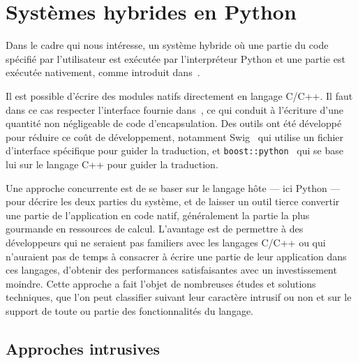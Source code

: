 \documentclass[renpar]{compas2013}
\begin{document}
\section{Systèmes hybrides en Python}\label{sec:python-hybrid}

Dans le cadre qui nous intéresse, un système hybride où une partie du code
spécifié par l'utilisateur est exécutée par l'interpréteur Python et une
partie est exécutée nativement, comme introduit dans~\cite{dongara2007}.

Il est possible d'écrire des modules natifs directement en langage C/C++.
Il faut dans ce cas respecter l'interface fournie dans~\cite{pythoncapi},
ce qui conduit à l'écriture d'une quantité non négligeable de code
d'encapsulation. Des outils ont été développé pour réduire ce coût de
développement, notamment Swig~\cite{swig2003} qui utilise un fichier
d'interface spécifique pour guider la traduction, et
\texttt{boost::python}~\cite{boostpython2007} qui se base lui sur le
langage C++ pour guider la traduction.

Une approche concurrente est de se baser sur le langage hôte --- ici
Python --- pour décrire les deux parties du système, et de laisser un
outil tierce convertir une partie de l'application en code natif,
généralement la partie la plus gourmande en ressources de calcul.
L'avantage est de permettre à des développeurs qui ne seraient pas
familiers avec les langages C/C++ ou qui n'auraient pas de temps à
consacrer à écrire une partie de leur application dans ces langages,
d'obtenir des performances satisfaisantes avec un investissement moindre.
Cette approche a fait l'objet de nombreuses études et solutions
techniques, que l'on peut classifier suivant leur caractère intrusif ou
non et sur le support de toute ou partie des fonctionnalités du langage.

\subsection{Approches intrusives}
\end{document}
